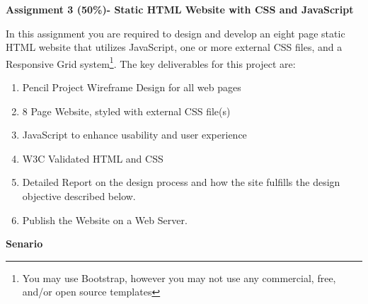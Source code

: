 
	
\begin{flushleft}
\Large\textbf{Assignment 3 (50\%)- Static HTML Website with CSS and JavaScript}\\
\end{flushleft}

In this assignment you are required to design and develop an eight page static HTML website that utilizes JavaScript, one or more external CSS files, and a Responsive Grid system\footnote{You may use Bootstrap, however you may not use any commercial, free, and/or open source templates}. The key deliverables for this project are:

\begin{enumerate}
	\item Pencil Project Wireframe Design for all web pages
	\item 8 Page Website, styled with external CSS file(s)
	\item JavaScript to enhance usability and user experience
	\item W3C Validated HTML and CSS
	\item Detailed Report on the design process and how the site fulfills the design objective described below.
	\item Publish the Website on a Web Server.
\end{enumerate}

\textbf{Senario}\\



